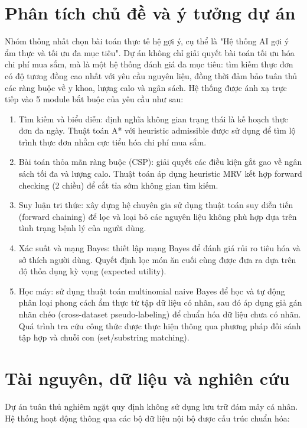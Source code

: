 \documentclass[a4paper, 12pt]{article}
\begin{document}
\newpage


\section{Phân tích chủ đề và ý tưởng dự án}
Nhóm thống nhất chọn bài toán thực tế hệ gợi ý, cụ thể là "Hệ thống AI gợi ý ẩm thực và tối ưu đa mục tiêu". Dự án không chỉ giải quyết bài toán tối ưu hóa chi phí mua sắm, mà là một hệ thống đánh giá đa mục tiêu: tìm kiếm thực đơn có độ tương đồng cao nhất với yêu cầu nguyên liệu, đồng thời đảm bảo tuân thủ các ràng buộc về y khoa, lượng calo và ngân sách. Hệ thống được ánh xạ trực tiếp vào 5 module bắt buộc của yêu cầu như sau:

\begin{enumerate}[label=\Alph*.]
    \item Tìm kiếm và biểu diễn: định nghĩa không gian trạng thái là kế hoạch thực đơn đa ngày. Thuật toán A* với heuristic admissible được sử dụng để tìm lộ trình thực đơn nhằm cực tiểu hóa chi phí mua sắm.
    \item Bài toán thỏa mãn ràng buộc (CSP): giải quyết các điều kiện gắt gao về ngân sách tối đa và lượng calo. Thuật toán áp dụng heuristic MRV kết hợp forward checking (2 chiều) để cắt tỉa sớm không gian tìm kiếm.
    \item Suy luận tri thức: xây dựng hệ chuyên gia sử dụng thuật toán suy diễn tiến (forward chaining) để lọc và loại bỏ các nguyên liệu không phù hợp dựa trên tình trạng bệnh lý của người dùng.
    \item Xác suất và mạng Bayes: thiết lập mạng Bayes để đánh giá rủi ro tiêu hóa và sở thích người dùng. Quyết định lọc món ăn cuối cùng được đưa ra dựa trên độ thỏa dụng kỳ vọng (expected utility).
    \item Học máy: sử dụng thuật toán multinomial naive Bayes để học và tự động phân loại phong cách ẩm thực từ tập dữ liệu có nhãn, sau đó áp dụng giả gán nhãn chéo (cross-dataset pseudo-labeling) để chuẩn hóa dữ liệu chưa có nhãn. Quá trình tra cứu công thức được thực hiện thông qua phương pháp đối sánh tập hợp và chuỗi con (set/substring matching).
\end{enumerate}

\section{Tài nguyên, dữ liệu và nghiên cứu}
Dự án tuân thủ nghiêm ngặt quy định không sử dụng lưu trữ đám mây cá nhân. Hệ thống hoạt động thông qua các bộ dữ liệu nội bộ được cấu trúc chuẩn hóa:
\end{document}
